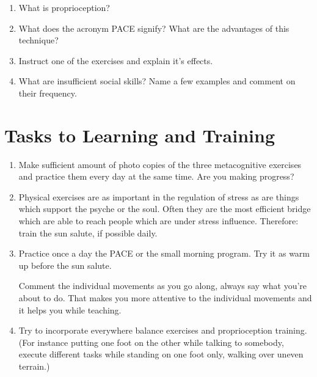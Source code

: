 \documentclass[../main.tex]{subfiles}
\begin{document}
\begin{enumerate}
          \vspace{4mm}
        \item What is proprioception?
              \vspace{4mm}
\item What does the acronym PACE signify? What are the advantages of this technique?
\item Instruct one of the exercises and explain it's effects.
      \vspace{4mm}
  \item What are insufficient social skills? Name a few examples and comment on their frequency. 
  \end{enumerate}

  \section{Tasks to Learning and Training}

  \begin{enumerate}[label = \Alph*]
  \item Make sufficient amount of photo copies of the three metacognitive exercises and practice them every day at the same time. Are you making progress?
  \item Physical exercises are as important in the regulation of stress as are things which support the psyche or the soul.
    Often they are the most efficient bridge which are able to reach people which are under stress influence.
    Therefore: train the sun salute, if possible daily.
  \item Practice once a day the PACE or the small morning program.
    Try it as warm up before the sun salute.

    Comment the individual movements as you go along, always say what you're about to do. That makes you more attentive to the individual movements and it helps you while teaching.

  \item Try to incorporate everywhere balance exercises and proprioception training.
    (For instance putting one foot on the other while talking to somebody, 
    execute different tasks while standing on one foot only,
    walking over uneven terrain.)
    \end{enumerate}
\end{document}
